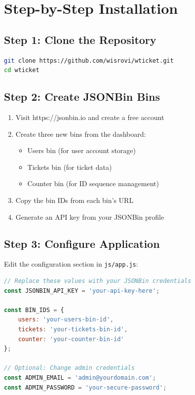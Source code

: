 \documentclass[12pt,a4paper]{report}
\begin{document}
\section{Step-by-Step Installation}
\label{sec:step-by-step}

\subsection{Step 1: Clone the Repository}
\label{sub:step1}

\begin{lstlisting}[language=bash, caption={Clone Repository Command}, label={lst:clone}]
git clone https://github.com/wisrovi/wticket.git
cd wticket
\end{lstlisting}

\subsection{Step 2: Create JSONBin Bins}
\label{sub:step2}

\begin{enumerate}
    \item Visit https://jsonbin.io and create a free account
    \item Create three new bins from the dashboard:
    \begin{itemize}
        \item Users bin (for user account storage)
        \item Tickets bin (for ticket data)
        \item Counter bin (for ID sequence management)
    \end{itemize}
    \item Copy the bin IDs from each bin's URL
    \item Generate an API key from your JSONBin profile
\end{enumerate}

\subsection{Step 3: Configure Application}
\label{sub:step3}

Edit the configuration section in \texttt{js/app.js}:

\begin{lstlisting}[language=JavaScript, caption={Application Configuration}, label={lst:config}]
// Replace these values with your JSONBin credentials
const JSONBIN_API_KEY = 'your-api-key-here';

const BIN_IDS = {
    users: 'your-users-bin-id',
    tickets: 'your-tickets-bin-id',
    counter: 'your-counter-bin-id'
};

// Optional: Change admin credentials
const ADMIN_EMAIL = 'admin@yourdomain.com';
const ADMIN_PASSWORD = 'your-secure-password';
\end{lstlisting}
\end{document}
